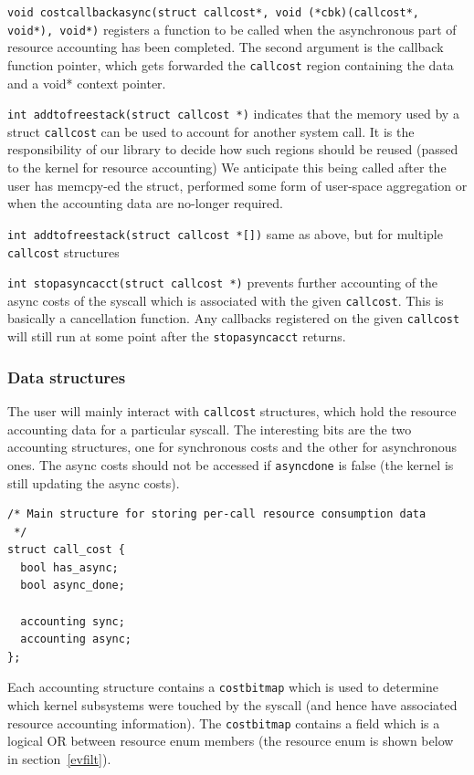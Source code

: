 \documentclass[12pt]{article}
\def\_{\textunderscore\-}
\begin{document}
{\color{blue}\texttt{void cost\_callback\_async(struct call\_cost*, void (*cbk)(call\_cost*, void*), void*)}} registers a function to be called when the asynchronous part of resource accounting has been completed. The second argument is the callback function pointer, which gets forwarded the \texttt{call\_cost} region containing the data and a void* context pointer.

{\color{blue}\texttt{int add\_to\_free\_stack(struct call\_cost *)}} indicates that the memory used by a struct \texttt{call\_cost} can be used to account for another system call. It is the responsibility of our library to decide how such regions should be reused (passed to the kernel for resource accounting) We anticipate this being called after the user has memcpy-ed the struct, performed some form of user-space aggregation or when the accounting data are no-longer required.

{\color{blue}\texttt{int add\_to\_free\_stack(struct call\_cost *[])}} same as above, but for multiple \texttt{call\_cost} structures

{\color{blue}\texttt{int stop\_async\_acct(struct call\_cost *)}} prevents further accounting of the async costs of the syscall which is associated with the given \texttt{call\_cost}. This is basically a cancellation function. Any callbacks registered on the given \texttt{call\_cost} will still run at some point after the \texttt{stop\_async\_acct} returns.

\subsubsection{Data structures}

The user will mainly interact with \texttt{call\_cost} structures, which hold the resource accounting data for a particular syscall. The interesting bits are the two accounting structures, one for synchronous costs and the other for asynchronous ones. The async costs should not be accessed if \texttt{async\_done} is false (the kernel is still updating the async costs).

\vspace{1em}
\begin{lstlisting}
/* Main structure for storing per-call resource consumption data
 */
struct call_cost {
  bool has_async;
  bool async_done;

  accounting sync;
  accounting async;
};
\end{lstlisting}

Each accounting structure contains a \texttt{cost\_bitmap} which is used to determine which kernel subsystems were touched by the syscall (and hence have associated resource accounting information). The \texttt{cost\_bitmap} contains a field which is a logical OR between resource enum members (the resource enum is shown below in section~\ref{evfilt}).
\end{document}
